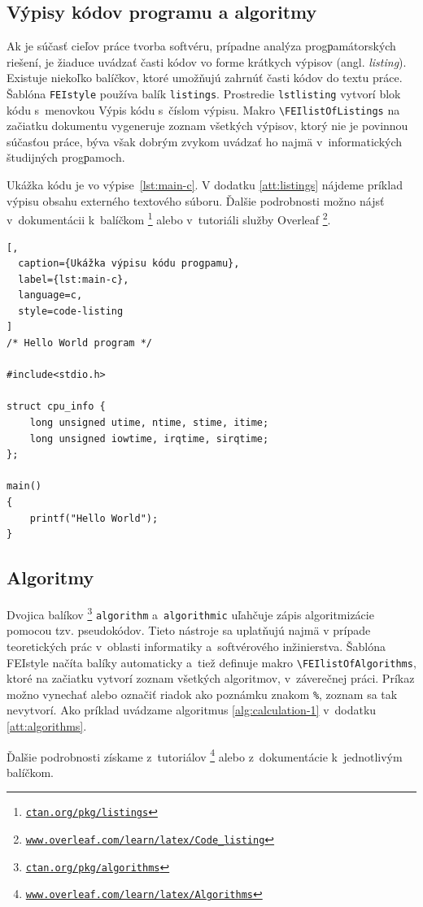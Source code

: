 \documentclass[../../../thesis.tex]{subfiles}
\begin{document}
\subsection{Výpisy kódov programu a algoritmy}
\label{sec:listings}
Ak je súčasť cieľov práce tvorba softvéru, prípadne analýza progрamátorských riešení,
je žiaduce uvádzať časti kódov vo forme krátkych výpisov (angl. \foreignlanguage{english}{\emph{listing}}).
Existuje niekoľko balíčkov, ktoré umožňujú zahrnúť časti kódov do textu práce.
Šablóna \verb|FEIstyle| používa balík \verb|listings|.
Prostredie \verb|lstlisting| vytvorí blok kódu s~menovkou Výpis kódu s~číslom výpisu.
Makro \verb|\FEIlistOfListings| na začiatku dokumentu vygeneruje zoznam všetkých výpisov,
ktorý nie je povinnou súčasťou práce,
býva však dobrým zvykom uvádzať ho najmä v~informatických študijných progрamoch.

Ukážka kódu je vo výpise~\ref{lst:main-c}.
V dodatku \ref{att:listings} nájdeme príklad výpisu obsahu externého textového súboru.
Ďalšie podrobnosti možno nájsť v~dokumentácii k~balíčkom%
\footnote{\href{https://ctan.org/pkg/listings}{\texttt{ctan.org/pkg/listings}}}
alebo v~tutoriáli služby Overleaf%
\footnote{\texttt{\href{https://www.overleaf.com/learn/latex/Code_listing}{www.overleaf.com/learn/latex/Code\_listing}}}.

\begin{lstlisting}[,
  caption={Ukážka výpisu kódu progрamu},
  label={lst:main-c},
  language=c,
  style=code-listing
]
/* Hello World program */

#include<stdio.h>

struct cpu_info {
    long unsigned utime, ntime, stime, itime;
    long unsigned iowtime, irqtime, sirqtime;
};

main()
{
    printf("Hello World");
}
\end{lstlisting}

\subsection*{Algoritmy}
Dvojica balíkov%
\footnote{\href{https://ctan.org/pkg/algorithms}{\texttt{ctan.org/pkg/algorithms}}}
\verb|algorithm|
a~\verb|algorithmic| uľahčuje zápis algoritmizácie pomocou tzv. pseudokódov.
Tieto nástroje sa uplatňujú najmä v prípade teoretických prác v~oblasti informatiky a~softvérového inžinierstva.
Šablóna FEIstyle načíta balíky automaticky a~tiež definuje makro \verb|\FEIlistOfAlgorithms|, ktoré na začiatku vytvorí zoznam všetkých algoritmov, v~záverečnej práci.
Príkaz možno vynechať alebo označiť riadok ako poznámku znakom \verb|%|, zoznam sa tak nevytvorí. Ako príklad uvádzame algoritmus \ref{alg:calculation-1} v~dodatku \ref{att:algorithms}.

Ďalšie podrobnosti získame z~tutoriálov%
\footnote{\href{https://www.overleaf.com/learn/latex/Algorithms}{\texttt{www.overleaf.com/learn/latex/Algorithms}}}
alebo z~dokumentácie k~jednotlivým balíčkom.
\end{document}
